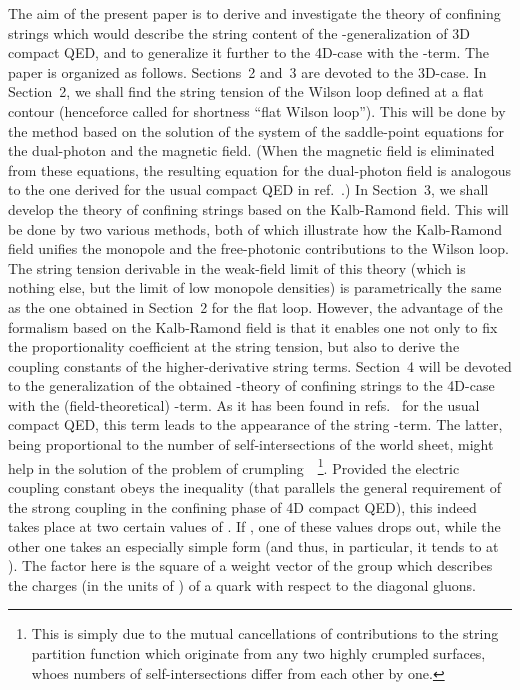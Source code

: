 \documentclass[a4paper,12pt]{article}
\begin{document}
The aim of the present paper is to derive and investigate the theory of confining
strings which would describe the string content of the \coordHE{}-generalization of 3D compact QED,
and to generalize it further to the 4D-case with the \myHighlight{$\theta$}\coordHE{}-term.
The paper is organized as follows. Sections~2 and~3 are devoted to the 3D-case. In Section~2, we shall find
the string tension of the Wilson loop defined at a flat contour (henceforce called for shortness ``flat Wilson loop'').
This will be done by the method based on the solution of the system of the saddle-point equations for the dual-photon
and the magnetic field. (When the magnetic field is eliminated from these equations, the resulting equation for the dual-photon
field is analogous to the one derived for the usual compact QED in ref.~\cite{polpl}.)
In Section~3, we shall develop the theory of confining strings
based on the Kalb-Ramond field. This will be done by two various methods, both of which illustrate how the Kalb-Ramond field
unifies the monopole and the free-photonic contributions to the Wilson loop.
The string tension derivable in the weak-field limit of this theory (which is nothing else, but
the limit of low monopole densities)
is parametrically the same as the one
obtained in Section~2 for the flat loop. However, the advantage of the formalism based on the Kalb-Ramond field is that it enables
one not only to fix the proportionality coefficient at the string tension, but also to derive
the coupling constants of the higher-derivative string terms.
Section~4 will be devoted to the
generalization of the obtained \coordHE{}-theory of confining strings to the 4D-case with the (field-theoretical) \myHighlight{$\theta$}\coordHE{}-term. As it has been
found in refs.~\cite{cristina, tq} for the usual compact QED, this term
leads to the appearance of the string \myHighlight{$\theta$}\coordHE{}-term.  The latter,
being proportional to the number of self-intersections of the world sheet, might help in
the solution of the problem of crumpling~\cite{dg}~\footnote{This is simply due to the mutual cancellations of contributions to the string
partition function which originate from any two highly crumpled surfaces, whoes numbers of self-intersections differ from each other
by one.}.
Provided the electric coupling constant \coordHE{} obeys the inequality \coordHE{}
(that parallels the general requirement of the strong coupling in the confining phase of 4D compact QED),
this indeed takes place
at two certain values of \myHighlight{$\theta$}\coordHE{}. If \coordHE{}, one of these values drops out, while the other one
takes an especially simple form \coordHE{}
(and thus, in particular, it tends to \coordHE{} at \coordHE{}). The factor \coordHE{} here is the square of a weight vector of the
group \coordHE{} which describes the charges (in the units of \coordHE{}) of a quark with respect to the diagonal gluons.
\end{document}

